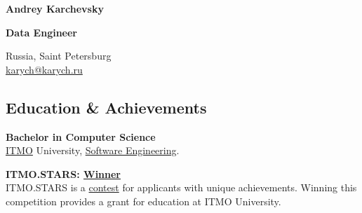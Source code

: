 \documentclass[a4paper,11pt]{article}
\newcommand{\MySkip}{
\vskip10pt
}
\newcommand{\myhref}[2]{%
\href{#1}{\textcolor{ColorTwo}{#2}}
}
\begin{document}
\thispagestyle{empty}

\begin{adjustbox}{valign=t}
\begin{minipage}{0.3\textwidth}

\begin{center}

\MySkip

{\LARGE \bfseries Andrey Karchevsky}
\MySkip
{\Large \bfseries \textcolor{ColorOne}{Data Engineer}}

\MySkip

\faMapPin\hspace{0.2em} Russia, Saint Petersburg \\
\faEnvelope\hspace{0.2em} \myhref{mailto:karych@karych.ru}{karych@karych.ru}

\end{center}

\begin{flushleft}
\section*{Education \& Achievements}
\begin{description}[font=\normalfont\color{ColorOne},leftmargin=0pt,labelwidth=0pt]
	\item[2023--2027] \textbf{Bachelor in Computer Science} \\
	\href{https://itmo.ru/}{ITMO} University, \href{https://fitp.itmo.ru/p/about-fitp/753}{Software Engineering}.

	\item[2023] \textbf{ITMO.STARS: \myhref{https://news.itmo.ru/en/education/students/news/13345/}{Winner}} \\
	ITMO.STARS is a \myhref{https://stars.itmo.ru/}{contest} for applicants with unique achievements. Winning this competition provides a grant for education at ITMO University.
\end{description}


\end{flushleft}
\end{minipage}
\end{adjustbox}
\end{document}
